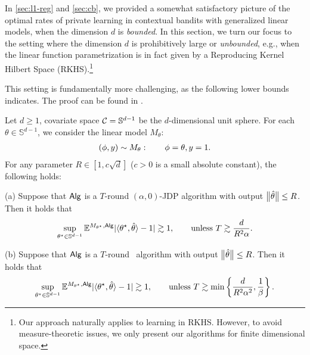 


In \cref{sec:l1-reg} and \cref{sec:cb}, we provided a somewhat satisfactory picture of the optimal rates of private learning in contextual bandits with generalized linear models, when the dimension $d$ is \emph{bounded}. 
In this section, we turn our focus to the setting where the dimension $d$ is prohibitively large or \emph{unbounded}, e.g., when the linear function parametrization is in fact given by a Reproducing Kernel Hilbert Space (RKHS).\footnote{Our approach naturally applies to learning in RKHS. However, to avoid measure-theoretic issues, we only present our algorithms for finite dimensional space.} 


This setting is fundamentally more challenging, as the following lower bounds indicates. The proof can be found in \citep[Appendix C]{chen2024private}. 

\newcommand{\Sd}{\mathbb{S}^{d-1}}
\begin{proposition}\label{prop:unbounded-lower}
Let $d\geq 1$, covariate space $\cC=\Sd$ be the $d$-dimensional unit sphere. 
For each $\theta\in\Sd$, we consider the linear model $M_\theta$:
\begin{align*}
    (\phi,y)\sim M_\theta: \qquad \phi=\theta, y=1.
\end{align*}
For any parameter $R\in[1,c\sqrt{d}]$ ($c>0$ is a small absolute constant), the following holds:

(a) Suppose that $\mathsf{Alg}$ is a $T$-round $(\alpha,0)$-JDP algorithm with output $\big\|\hat{\theta}\big\|\leq R$. Then it holds that
\begin{align*}
    \sup_{\ths\in\Sd}\EE^{M_{\ths},\alg} \absn{\lr \ths,\hth\rr -1 }\geqsim 1, \qquad \text{unless }T\geqsim \frac{d}{R^2\alpha}.
\end{align*}

(b) Suppose that $\mathsf{Alg}$ is a $T$-round \aLDP~algorithm with output $\big\|\hat{\theta}\big\|\leq R$. Then it holds that
\begin{align*}
    \sup_{\ths\in\Sd}\EE^{M_{\ths},\alg} \absn{\lr \ths,\hth\rr -1 }\geqsim 1, \qquad \text{unless }T\geqsim \min\sset{\frac{d}{R^2\alpha^2}, \frac{1}{\beta}}.
\end{align*}
\end{proposition}

